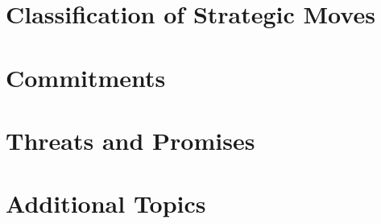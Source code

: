 \documentclass{beamer}
\theoremstyle{plain}
\begin{document}
\section{Classification of Strategic Moves}

\section{Commitments}

\section{Threats and Promises}

\section{Additional Topics}
\end{document}
